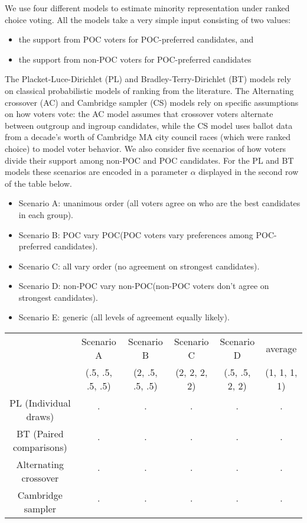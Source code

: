 \documentclass{report}
\newcommand{\POC}{POC\xspace} %
\begin{document}
We use four different models to estimate minority representation under ranked choice voting. All the models take a very simple input consisting of two values: 
\begin{itemize}
\item[(1)] the support from \POC voters for \POC -preferred candidates, and 
\item[(2)] the support from non-\POC voters for \POC -preferred candidates
\end{itemize}
The Placket-Luce-Dirichlet (PL) and Bradley-Terry-Dirichlet (BT) models rely on classical probabilistic models of ranking from the literature. The Alternating crossover (AC) and Cambridge sampler (CS) models rely on specific assumptions on how voters vote: the AC model assumes that crossover voters alternate between outgroup and ingroup candidates, while the CS model uses ballot data from a decade's worth of Cambridge MA city council races (which were ranked choice) to model voter behavior. We also consider five scenarios of how voters divide their support among non-\POC and \POC candidates. For the PL and BT models these scenarios are encoded in a parameter $\alpha$ displayed in the second row of the table below.

\begin{itemize}
\item Scenario A: unanimous order (all voters agree on who are the best candidates in each group).
\item Scenario B: \POC vary \POC (POC voters vary preferences among \POC -preferred candidates).
\item Scenario C: all vary order (no agreement on strongest candidates).
\item Scenario D: non-\POC vary non-\POC (non-\POC voters don’t agree on strongest candidates).
\item Scenario E: generic (all levels of agreement equally likely).
\end{itemize}


\begin{table}[h]
\centering
\begin{tabular}{ |c|c|c|c|c|c| }
\hline
\cellcolor{Gray}{\bf $\cdot$ seats}
 & Scenario A & Scenario B & Scenario C & Scenario D & average \\
\cline{2-6}
\cellcolor{Gray}{\bf $\cdot$ C / $\cdot$ candidates}
 & (.5, .5, .5, .5) & (2, .5, .5, .5) &  (2, 2, 2, 2) &  
 (.5, .5, 2, 2) & (1, 1, 1, 1) \\
\hline \hline
PL (Individual draws)  & $\cdot$  & $\cdot$ & $\cdot$ & $\cdot$ & $\cdot$ \\
\hline
BT (Paired comparisons) & $\cdot$  & $\cdot$ & $\cdot$ & $\cdot$ & $\cdot$ \\
\hline
Alternating crossover & $\cdot$  & $\cdot$ & $\cdot$ & $\cdot$ & $\cdot$ \\
\hline
Cambridge sampler & $\cdot$  & $\cdot$ & $\cdot$ & $\cdot$ & $\cdot$ \\
\hline
\end{tabular}
\end{table}
\end{document}
